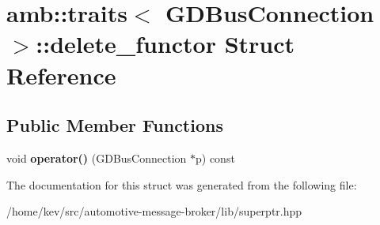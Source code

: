 \hypertarget{structamb_1_1traits_3_01GDBusConnection_01_4_1_1delete__functor}{\section{amb\+:\+:traits$<$ G\+D\+Bus\+Connection $>$\+:\+:delete\+\_\+functor Struct Reference}
\label{structamb_1_1traits_3_01GDBusConnection_01_4_1_1delete__functor}
}
\subsection*{Public Member Functions}
\begin{DoxyCompactItemize}
\item 
\hypertarget{structamb_1_1traits_3_01GDBusConnection_01_4_1_1delete__functor_a3f966a938e963a04abbde58f40aa2b62}{void {\bfseries operator()} (G\+D\+Bus\+Connection $\ast$p) const }\label{structamb_1_1traits_3_01GDBusConnection_01_4_1_1delete__functor_a3f966a938e963a04abbde58f40aa2b62}

\end{DoxyCompactItemize}


The documentation for this struct was generated from the following file\+:\begin{DoxyCompactItemize}
\item 
/home/kev/src/automotive-\/message-\/broker/lib/superptr.\+hpp\end{DoxyCompactItemize}
